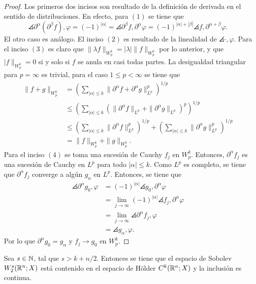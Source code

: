 \begin{proof}
	Los primeros dos incisos son resultado de la definición de derivada en el sentido de distribuciones. En efecto, para $(1)$ se tiene que 
	\begin{equation*}
		\angles{\partial^\alpha(\partial^\beta f), \varphi} = 
		(-1)^{|\alpha|} = \angles{\partial^\beta f, \partial^\alpha\varphi} =
		(-1)^{|\alpha| + |\beta|} \angles{f, \partial^{\alpha+\beta}\varphi}. 
	\end{equation*}
	El otro caso es análogo. El inciso $(2)$ es resultado de la linealidad de $\angles{\cdot, \varphi}$.  Para el inciso $(3)$ es claro que $\|\lambda f\|_{W^k_p} = |\lambda|\|f\|_{W^k_p}$ por lo anterior, y que $|f\|_{W^k_p} = 0$ si y solo si $f$ se anula en casi todas partes. La desigualdad triangular para $p=\infty$ es trivial, para el caso $1\leq p<\infty$ se tiene que 
	\begin{align*}
		\|f+g\|_{W^k_p} &= \left(\sum_{|\alpha|\leq k} \|\partial^\alpha f + \partial^\alpha g\|_{L^p}^p
		\right)^{1/p} \\ 
		& \leq \left(\sum_{|\alpha|\leq k} (\|\partial^\alpha f\|_{L^p} +  \|\partial^\alpha g\|_{L^p})^p
		\right)^{1/p} \\
		& \leq \left(\sum_{|\alpha|\leq k} \|\partial^\alpha f\|_{L^p}^p
		\right)^{1/p} + \left(\sum_{|\alpha|\leq k} \|\partial^\alpha g\|_{L^p}^p
		\right)^{1/p} \\
		& = \|f\|_{W^k_p} + \|g\|_{W^k_p}.
	\end{align*}
	Para el inciso $(4)$ se toma una sucesión de Cauchy $f_j$ en $W^k_p$. Entonces, $\partial^\alpha f_j$ es una sucesión de Cauchy en $L^p$ para todo $|\alpha|\leq k$. Como $L^p$ es completo, se tiene que $\partial^\alpha f_j$ converge a algún $g_\alpha$ en $L^p$. Entonces, se tiene que
	\begin{align*}
		\angles{\partial^\alpha g_0, \varphi}& = (-1)^{|\alpha|}  \angles{g_0, \partial^\alpha \varphi} \\
		& = \lim_{j\rightarrow\infty}(-1)^{|\alpha|} \angles{f_j, \partial^\alpha \varphi} \\
		& =  \lim_{j\rightarrow\infty}\angles{\partial^\alpha f_j, \varphi} \\
		& = \angles{g_\alpha, \varphi}.
	\end{align*} 
	Por lo que $\partial^\alpha g_0 = g_\alpha$ y $f_j \rightarrow g_0$ en $W^k_p$.
\end{proof}
\begin{theorem}\label{theo:Sobolev-embedding-R}
	Sea $s\in\mathbb{N}$, tal que $s>k+n/2$. Entonces se tiene que el espacio de Sobolev $W^s_2(\mathbb{R}^n;X)$ está contenido en el espacio de H\"older $C^k(\mathbb{R}^n;X)$ y la inclusión es continua.
\end{theorem}
